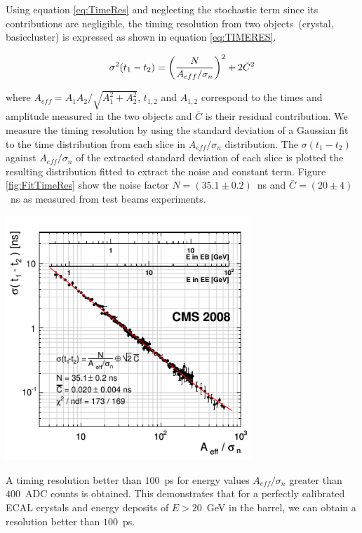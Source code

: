 Using equation \ref{eq:TimeRes} and neglecting the stochastic term since its contributions are negligible, the timing resolution from two objects~(crystal, basiccluster) is expressed  as shown in equation \ref{eq:TIMERES}.
 
 \begin{equation}{\label{eq:TIMERES}}
 \sigma^{2}(t_{1} - t_{2}) = \left(\frac{N}{A_{eff}/ \sigma_{n}}\right)^{2} + 2\bar{C}^{2}
 \end{equation}
 
 where $A_{eff} = A_{1}A_{2}/\sqrt{A^{2}_{1} + A^{2}_{2}}$, $t_{1,2}$ and $A_{1,2}$ correspond to the times and amplitude measured in the two objects and $\bar{C}$ is their residual contribution.
We measure the timing resolution by using the standard deviation of a Gaussian fit to the time distribution from each slice in $A_{eff}/\sigma_{n}$ distribution. The $\sigma(t_{1} - t_{2})$ against $A_{eff}/\sigma_{n}$ of the extracted standard deviation of each slice is plotted the resulting distribution fitted to extract the noise and constant term.  Figure \ref{fig:FitTimeRes} show the noise factor $N = (35.1 \pm 0.2)$~ns and $\bar{C} = (20 \pm 4)$ ~ns as measured from test beams experiments. 

\begin{center}
\centering
\mbox{\includegraphics[height=0.6\textwidth, width=0.7\textwidth]{THESISPLOTS/ECAL_Timing_Resolution.png}}
\label{fig:FitTimeRes}
\end{center}
A timing resolution better than $100$~ps for energy values $A_{eff}/\sigma_{n}$ greater than $400$~ADC counts is obtained. This demonstrates that for a perfectly calibrated ECAL crystals and energy deposits of $E > 20$~GeV in the barrel, we can obtain a resolution better than $100$~ps. 

